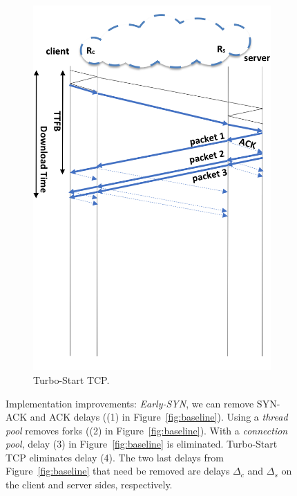 \documentclass[newfonts=false,format=sigconf,anonymous,10pt,letterpaper]{acmart}
\newcommand{\oursys}{Pied Piper\xspace}
\begin{document}
\begin{figure}[!t]
\begin{subfigure}{0.48\columnwidth}
  \includegraphics[width=\columnwidth]{figures/turbo.png}
    \caption{Turbo-Start TCP.} \label{fig:turbo-start-tcp}
\end{subfigure}
    \caption{%
    Implementation improvements: %
    \textit{Early-SYN}, we can remove SYN-ACK and ACK delays ((1) in Figure~\ref{fig:baseline}). Using a \textit{thread pool} removes forks ((2) in Figure~\ref{fig:baseline}). With a \textit{connection pool}, delay (3) in Figure~\ref{fig:baseline} is eliminated. Turbo-Start TCP eliminates delay (4). The two last delays from Figure~\ref{fig:baseline} that need be removed are delays $\Delta_c$ and $\Delta_s$ on the client and server sides, respectively. %
    }
    \label{fig:KSPLIT-improvements}
\end{figure}
\end{document}

